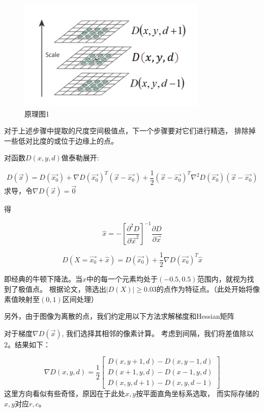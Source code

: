 \documentclass{article}
\begin{document}
\begin{figure}[h]
\centering
\includegraphics[width=0.8\textwidth]{./others/1}
\caption{原理图1}
\end{figure}

\newpage

    对于上述步骤中提取的尺度空间极值点，下一个步骤要对它们进行精选，
    排除掉一些低对比度的或位于边缘上的点。

    对函数\(D(x, y, d)\)做泰勒展开:

\[
    D(\vec{x}) = D(\vec{x_0})
    + \nabla D(\vec{x_0})^T (\vec{x} - \vec{x_0})
    + \frac{1}{2} (\vec{x} - \vec{x_0})^T \nabla^2 D(\vec{x_0}) (\vec{x} - \vec{x_0})
\]
    求导，令\(\nabla D(\vec{x}) = \vec{0}\)

    得

\[
    \hat{x} = -\left[\frac{\partial^2D}{\partial\vec{x}^2}\right]^{-1}\frac{\partial D}{\partial\vec{x}}
\]

\[
    D(X = \vec{x_0} + \hat{x}) = D(\vec{x_0}) + \frac{1}{2}\nabla D(\vec{x_0})^T \hat{x}
\]

    即经典的牛顿下降法。当\(\hat{x}\)中的每一个元素均处于\((-0.5, 0.5)\)范围内，就视为找到了极值点。
    根据论文，筛选出\(|D(X)| \geq 0.03\)的点作为特征点。（此处开始将像素值映射至\((0, 1)\)区间处理）

    另外，由于图像为离散的点，我们约定用以下方法求解梯度和Hessian矩阵

    对于梯度\(\nabla D(\vec{x})\), 我们选择其相邻的像素计算。
    考虑到间隔，我们将差值除以2。结果如下：

\[
    \nabla D(x, y, d) = \frac{1}{2}
    \begin{bmatrix}
        D(x, y + 1, d) - D(x, y - 1, d) \\
        D(x + 1, y, d) - D(x - 1, y, d) \\
        D(x, y, d + 1) - D(x, y, d - 1)
    \end{bmatrix}
\]
    这里方向看似有些奇怪，原因在于此处\(x, y\)按平面直角坐标系选取，
    而实际存储的\(x, y\)对应\(r, c\)。
\end{document}

